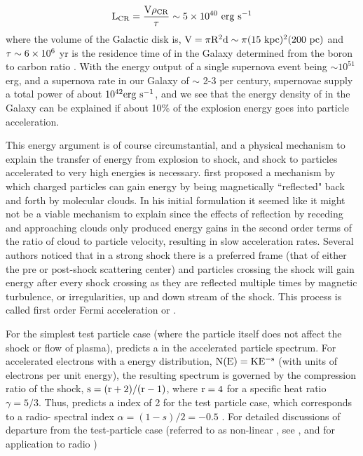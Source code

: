 \begin{equation}\label{eq:crLum}
\rm {L_{CR} = \frac{V\rho_{CR}}{\tau} \sim 5\times 10^{40}~erg~s^{-1}}
\end{equation}
where the volume of the Galactic disk is, ${\rm V = \pi R^2 d \sim  \pi (15~kpc)^2(200~pc)}$ and ${\rm \tau \sim 6\times 10^6}$ yr is the residence time of \crs{} in the Galaxy determined from the boron to carbon ratio \citep{Gaisser90}. With the energy output of a single supernova event being $\sim 10^{51}$ erg, and a supernova rate in our Galaxy of $\sim$ 2-3 per century, supernovae supply a total power of about ${\rm 10^{42} erg~s^{-1}}$, and we see that the energy density of \crs{} in the Galaxy can be explained if about 10\% of the explosion energy goes into particle acceleration.

This energy argument is of course circumstantial, and a physical mechanism to explain the transfer of energy from explosion to shock, and shock to particles accelerated to very high energies is necessary. \cite{Fermi49} first proposed a mechanism by which charged particles can  gain energy by being magnetically ``reflected" back and forth by molecular clouds. In his initial formulation it seemed like it might not be a viable mechanism to explain \crs{} since the effects of reflection by receding and approaching clouds 
only produced energy gains in the second order terms of the ratio of cloud to particle velocity, resulting in slow acceleration rates. Several authors \citep[for example]{Bell78,Blandford78} noticed that in a strong shock there is a preferred frame (that of either the pre or post-shock scattering center) and particles crossing the shock will gain energy after every shock crossing as they are reflected multiple times by magnetic turbulence, or irregularities, up and down stream of the shock. This process is called first order Fermi acceleration or \dsa{}.

For the simplest test particle case (where the particle itself does not affect the shock or flow of plasma), \dsa{} predicts a \pl{} in the accelerated particle spectrum. For accelerated electrons with a \pl{} energy distribution, ${\rm N(E) = KE^{-s}}$ (with units of electrons per unit energy), the resulting \sync{} spectrum is governed by the compression ratio of the shock, ${\rm s = (r+2)/(r-1)} $, where ${\rm r = 4}$ for a specific heat ratio $\gamma = 5/3$\cite{}. Thus, \dsa{} predicts a \pl{} index of 2 for the test particle case, which corresponds to a radio-\sync{} spectral index $\alpha = (1-s)/2 = -0.5$   \citep[and Chapter \ref{gamAstr:Emiss} ]{Pacholczyk70}. For detailed discussions of departure from the test-particle case (referred to as non-linear \dsa{}, see \cite{Reynolds08},\cite{Malkov01} and \cite{Urosevic14} for application to radio \snrs{})

